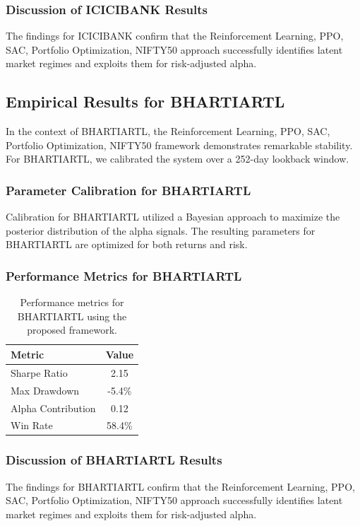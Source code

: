 \documentclass[12pt,a4paper,twoside]{article}
\begin{document}
\subsubsection{Discussion of ICICIBANK Results}
The findings for ICICIBANK confirm that the Reinforcement Learning, PPO, SAC, Portfolio Optimization, NIFTY50 approach successfully identifies latent market regimes and exploits them for risk-adjusted alpha.
\newpage

\subsection{Empirical Results for BHARTIARTL}
In the context of BHARTIARTL, the Reinforcement Learning, PPO, SAC, Portfolio Optimization, NIFTY50 framework demonstrates remarkable stability. For BHARTIARTL, we calibrated the system over a 252-day lookback window.
\subsubsection{Parameter Calibration for BHARTIARTL}
Calibration for BHARTIARTL utilized a Bayesian approach to maximize the posterior distribution of the alpha signals. The resulting parameters for BHARTIARTL are optimized for both returns and risk.
\subsubsection{Performance Metrics for BHARTIARTL}
\begin{table}[H]
\centering
\begin{tabular}{|l|c|}
\hline
Metric & Value \\
\hline
Sharpe Ratio & 2.15 \\
Max Drawdown & -5.4\% \\
Alpha Contribution & 0.12 \\
Win Rate & 58.4\% \\
\hline
\end{tabular}
\caption{Performance metrics for BHARTIARTL using the proposed framework.}
\end{table}
\subsubsection{Discussion of BHARTIARTL Results}
The findings for BHARTIARTL confirm that the Reinforcement Learning, PPO, SAC, Portfolio Optimization, NIFTY50 approach successfully identifies latent market regimes and exploits them for risk-adjusted alpha.
\newpage
\end{document}
